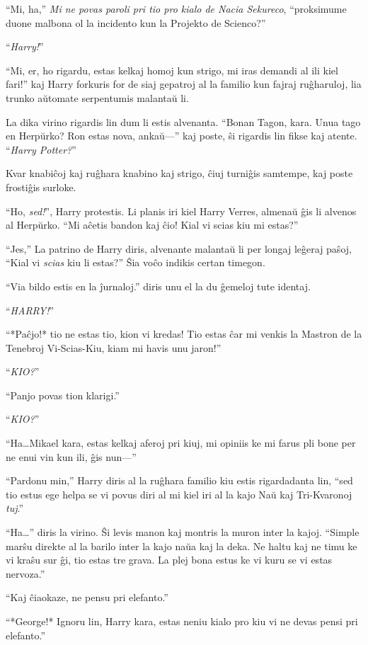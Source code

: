 ``Mi, ha,'' \emph{Mi ne povas paroli pri tio pro kialo de Nacia
Sekureco}, ``proksimume duone malbona ol la incidento kun la
Projekto de Scienco?''

``\emph{Harry!}''

  ``Mi, er, ho rigardu, estas kelkaj homoj kun strigo, mi iras demandi
al ili kiel fari!'' kaj Harry forkuris for de siaj gepatroj al la
familio kun fajraj ruĝharuloj, lia trunko aŭtomate serpentumis
malantaŭ li.

La dika virino rigardis lin dum li estis alvenanta. ``Bonan Tagon,
kara. Unua tago en Herpŭrko? Ron estas nova, ankaŭ—'' kaj poste, ŝi
rigardis lin fikse kaj atente. ``\emph{Harry Potter?}''

Kvar knabiĉoj kaj ruĝhara knabino kaj strigo, ĉiuj turniĝis samtempe,
kaj poste frostiĝis surloke.

``Ho, \emph{sed!}'', Harry protestis. Li planis iri kiel Harry Verres,
almenaŭ ĝis li alvenos al Herpŭrko. ``Mi aĉetis bandon kaj ĉio! Kial
vi scias kiu mi estas?''

``Jes,'' La patrino de Harry diris, alvenante malantaŭ li per longaj
leĝeraj paŝoj, ``Kial vi \emph{scias} kiu li estas?'' Ŝia voĉo indikis
certan timegon.

``Via bildo estis en la ĵurnaloj.'' diris unu el la du ĝemeloj tute
identaj.

``\emph{HARRY!}''

``*Paĉjo!* tio ne estas tio, kion vi kredas! Tio estas ĉar mi venkis la
Mastron de la Tenebroj Vi-Scias-Kiu, kiam mi havis unu jaron!''

``\emph{KIO?}''

``Panjo povas tion klarigi.''

``\emph{KIO?}''

``Ha\ldots Mikael kara, estas kelkaj aferoj pri kiuj, mi opiniis ke mi
farus pli bone per ne enui vin kun ili, ĝis nun—''

``Pardonu min,'' Harry diris al la ruĝhara familio kiu estis
rigardadanta lin, ``sed tio estus ege helpa se vi povus diri al mi
kiel iri al la kajo Naŭ kaj Tri-Kvaronoj \emph{tuj}.''

``Ha\ldots'' diris la virino. Ŝi levis manon kaj montris la muron
inter la kajoj. ``Simple marŝu direkte al la barilo inter la kajo naŭa
kaj la deka. Ne haltu kaj ne timu ke vi kraŝu sur ĝi, tio estas tre
grava. La plej bona estus ke vi kuru se vi estas nervoza.''

``Kaj ĉiaokaze, ne pensu pri elefanto.''

``*George!* Ignoru lin, Harry kara, estas neniu kialo pro kiu vi ne
devas pensi pri elefanto.''

